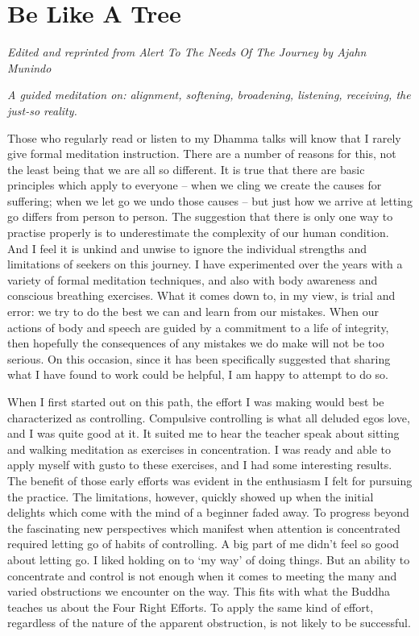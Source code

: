 \chapter{Be Like A Tree}

{\raggedright
\emph{Edited and reprinted from \emph{Alert To The Needs Of The Journey}\cite{alert} by Ajahn Munindo}

\emph{A guided meditation on: alignment, softening, broadening, listening, receiving, the just-so reality.}
\par}

\bigskip

Those who regularly read or listen to my Dhamma talks will know that I
rarely give formal meditation instruction. There are a number of reasons
for this, not the least being that we are all so different. It is true
that there are basic principles which apply to everyone -- when we cling
we create the causes for suffering; when we let go we undo those causes
-- but just how we arrive at letting go differs from person to person.
The suggestion that there is only one way to practise properly is to
underestimate the complexity of our human condition. And I feel it is
unkind and unwise to ignore the individual strengths and limitations of
seekers on this journey. I have experimented over the years with a
variety of formal meditation techniques, and also with body awareness
and conscious breathing exercises. What it comes down to, in my view, is
trial and error: we try to do the best we can and learn from our
mistakes. When our actions of body and speech are guided by a commitment
to a life of integrity, then hopefully the consequences of any mistakes
we do make will not be too serious. On this occasion, since it has been
specifically suggested that sharing what I have found to work could be
helpful, I am happy to attempt to do so.

When I first started out on this path, the effort I was making would
best be characterized as controlling. Compulsive controlling is what all
deluded egos love, and I was quite good at it. It suited me to hear the
teacher speak about sitting and walking meditation as exercises in
concentration. I was ready and able to apply myself with gusto to these
exercises, and I had some interesting results. The benefit of those
early efforts was evident in the enthusiasm I felt for pursuing the
practice. The limitations, however, quickly showed up when the initial
delights which come with the mind of a beginner faded away. To progress
beyond the fascinating new perspectives which manifest when attention is
concentrated required letting go of habits of controlling. A big part of
me didn't feel so good about letting go. I liked holding on to `my way'
of doing things. But an ability to concentrate and control is not enough
when it comes to meeting the many and varied obstructions we encounter
on the way. This fits with what the Buddha teaches us about the Four
Right Efforts. To apply the same kind of effort, regardless of the
nature of the apparent obstruction, is not likely to be successful.

